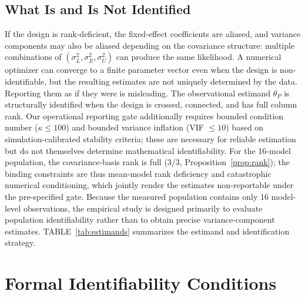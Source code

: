 \documentclass[11pt]{article}
\theoremstyle{definition}
\theoremstyle{plain}
\begin{document}
\subsection{What Is and Is Not Identified}
If the design is rank-deficient, the fixed-effect coefficients are aliased, and variance components may also be aliased depending on the covariance structure: multiple combinations of $(\sigma^2_L, \sigma^2_E, \sigma^2_U)$ can produce the same likelihood. A numerical optimizer can converge to a finite parameter vector even when the design is non-identifiable, but the resulting estimates are not uniquely determined by the data. Reporting them as if they were is misleading. The observational estimand $\theta_P$ is structurally identified when the design is crossed, connected, and has full column rank. Our operational reporting gate additionally requires bounded condition number ($\kappa \leq 100$) and bounded variance inflation (VIF $\leq 10$) based on simulation-calibrated stability criteria; these are necessary for reliable estimation but do not themselves determine mathematical identifiability. For the 16-model population, the covariance-basis rank is full (3/3, Proposition~\ref{prop:rank}); the binding constraints are thus mean-model rank deficiency and catastrophic numerical conditioning, which jointly render the estimates non-reportable under the pre-specified gate. Because the measured population contains only 16 model-level observations, the empirical study is designed primarily to evaluate population identifiability rather than to obtain precise variance-component estimates. TABLE~\ref{tab:estimands} summarizes the estimand and identification strategy.

\begin{table}[!htbp]
\caption{\textbf{Estimand and Identification Strategy.}}
\label{tab:estimands}
\centering
\footnotesize
{}
\end{table}

\section{Formal Identifiability Conditions}
\label{sec:ident}
\end{document}
